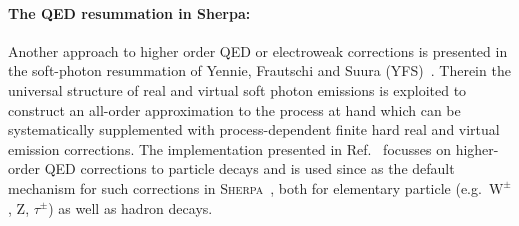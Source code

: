 \documentclass[11pt]{cernrep}
\DeclareRobustCommand{\PZ}{{\ensuremath{\mathrm{Z}}}}
\DeclareRobustCommand{\PWpm}{{\ensuremath{\mathrm{W}^{\pm}}}}
\begin{document}
\paragraph{The QED resummation in Sherpa:}
Another approach to higher order QED or electroweak corrections is 
presented in the soft-photon resummation of Yennie, Frautschi and 
Suura (YFS)~\cite{Yennie:1961ad}. Therein the universal structure 
of real and virtual soft photon emissions is exploited to construct 
an all-order approximation to the process at hand which can be 
systematically supplemented with process-dependent finite hard 
real and virtual emission corrections. The implementation presented 
in Ref.~\cite{Schonherr:2008av} focusses on higher-order QED corrections 
to particle decays and is used since as the default mechanism for such 
corrections in \textsc{Sherpa}~\cite{Gleisberg:2008ta}, both for 
elementary particle (e.g.\ $\PWpm$, $\PZ$, $\tau^\pm$) as well as 
hadron decays. 
\end{document}
